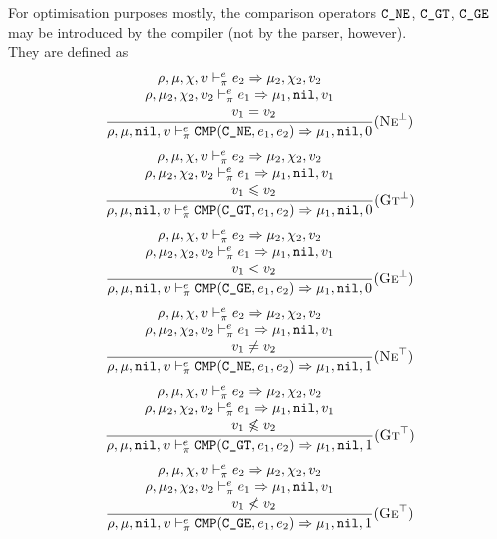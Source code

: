 For optimisation purposes mostly, the comparison operators \(\texttt{C\_NE}\), \(\texttt{C\_GT}\), \(\texttt{C\_GE}\) may be introduced by the compiler (not by the parser, however).\\
They are defined as
\[\dfrac{\begin{array}{c}
    \rho,\mu,\chi,v \vdash_\pi^e e_2\Rightarrow \mu_2,\chi_2,v_2 \\
    \rho,\mu_2,\chi_2,v_2 \vdash_\pi^e e_1\Rightarrow \mu_1,\texttt{nil},v_1 \\
    \qquad v_1 = v_2
\end{array}}{\rho,\mu,\texttt{nil},v \vdash_\pi^e \texttt{CMP}(\texttt{C\_NE}, e_1, e_2) \Rightarrow \mu_1,\texttt{nil},0}(\textsc{Ne}^\bot)\]
\[\dfrac{\begin{array}{c}
    \rho,\mu,\chi,v \vdash_\pi^e e_2\Rightarrow \mu_2,\chi_2,v_2 \\
    \rho,\mu_2,\chi_2,v_2 \vdash_\pi^e e_1\Rightarrow \mu_1,\texttt{nil},v_1 \\
    \qquad v_1 \leqslant v_2
\end{array}}{\rho,\mu,\texttt{nil},v \vdash_\pi^e \texttt{CMP}(\texttt{C\_GT}, e_1, e_2) \Rightarrow \mu_1,\texttt{nil},0}(\textsc{Gt}^\bot)\]
\[\dfrac{\begin{array}{c}
    \rho,\mu,\chi,v \vdash_\pi^e e_2\Rightarrow \mu_2,\chi_2,v_2 \\
    \rho,\mu_2,\chi_2,v_2 \vdash_\pi^e e_1\Rightarrow \mu_1,\texttt{nil},v_1 \\
    \qquad v_1 < v_2
\end{array}}{\rho,\mu,\texttt{nil},v \vdash_\pi^e \texttt{CMP}(\texttt{C\_GE}, e_1, e_2) \Rightarrow \mu_1,\texttt{nil},0}(\textsc{Ge}^\bot)\]
\[\dfrac{\begin{array}{c}
    \rho,\mu,\chi,v \vdash_\pi^e e_2\Rightarrow \mu_2,\chi_2,v_2 \\
    \rho,\mu_2,\chi_2,v_2 \vdash_\pi^e e_1\Rightarrow \mu_1,\texttt{nil},v_1 \\
    \qquad v_1 \ne v_2
\end{array}}{\rho,\mu,\texttt{nil},v \vdash_\pi^e \texttt{CMP}(\texttt{C\_NE}, e_1, e_2) \Rightarrow \mu_1,\texttt{nil},1}(\textsc{Ne}^\top)\]
\[\dfrac{\begin{array}{c}
    \rho,\mu,\chi,v \vdash_\pi^e e_2\Rightarrow \mu_2,\chi_2,v_2 \\
    \rho,\mu_2,\chi_2,v_2 \vdash_\pi^e e_1\Rightarrow \mu_1,\texttt{nil},v_1 \\
    \qquad v_1 \not\leqslant v_2
\end{array}}{\rho,\mu,\texttt{nil},v \vdash_\pi^e \texttt{CMP}(\texttt{C\_GT}, e_1, e_2) \Rightarrow \mu_1,\texttt{nil},1}(\textsc{Gt}^\top)\]
\[\dfrac{\begin{array}{c}
    \rho,\mu,\chi,v \vdash_\pi^e e_2\Rightarrow \mu_2,\chi_2,v_2 \\
    \rho,\mu_2,\chi_2,v_2 \vdash_\pi^e e_1\Rightarrow \mu_1,\texttt{nil},v_1 \\
    \qquad v_1 \not< v_2
\end{array}}{\rho,\mu,\texttt{nil},v \vdash_\pi^e \texttt{CMP}(\texttt{C\_GE}, e_1, e_2) \Rightarrow \mu_1,\texttt{nil},1}(\textsc{Ge}^\top)\]


